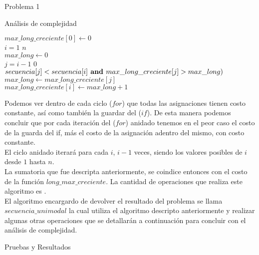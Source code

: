 \begin{section}{Problema 1}
\begin{subsection}{Análisis de complejidad}
	\begin{pseudo}
		\tab $max\_long\_creciente[0] \leftarrow 0$ \tab \tab {} \\
		\tab \FOR $i=1$ \TO $n$ \\
		\tab \tab $max\_long \leftarrow 0$ \tab \tab \tab \tab {} \\
		\tab \tab \FOR $j=i-1$ \TO $0$ \tab {}\\
		\tab \tab \tab \IF $ secuencia[j] <  secuencia[i] \textbf{ and } max\_long\_creciente [j] > max\_long)$  \\
		\tab \tab \tab \tab  $max\_long \leftarrow max\_long\_creciente[j] $ \tab {} \\
		\tab $max\_long\_creciente[i] \leftarrow max\_long+1$ \tab \tab \tab {} \\
	\end{pseudo}

	Podemos ver dentro de cada ciclo ($for$) que todas las asignaciones tienen costo constante, así como también la guardar del ($if$). De esta manera podemos concluir que por cada iteración del ($for$) anidado tenemos en el peor caso el costo de la guarda del if, más el costo de la asignación adentro del mismo, con costo constante.\\
	El ciclo anidado iterará para cada $i$, $i-1$ veces, siendo los valores posibles de $i$ desde $1$ hasta $n$.\\
	La sumatoria que fue descripta anteriormente, se coindice entonces con el costo de la función $long\_max\_creciente$. La cantidad de operaciones que realiza este algoritmo es .\\
	
	El algoritmo encargardo de devolver el resultado del problema se llama $secuencia\_unimodal$ la cual utiliza el algoritmo descripto anteriormente y realizar algunas otras operaciones que se detallarán a continuación para concluir con el análisis de complejidad.\\
	
	\end{subsection}


	\begin{subsection}{Pruebas y Resultados}

	\end{subsection}

\end{section}

